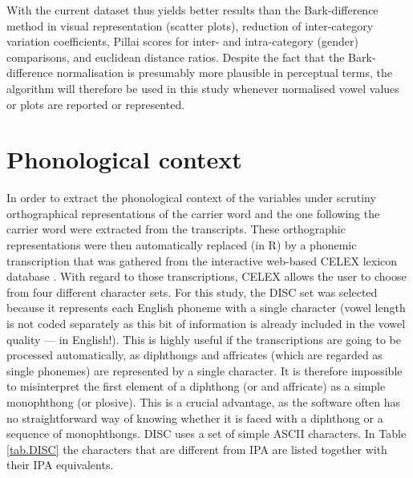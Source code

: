 With the current dataset \citeauthor{wattfabricius2002} thus yields better results than the Bark-difference method in visual representation (scatter plots), reduction of inter-category variation coefficients, Pillai scores for inter- and intra-category (gender) comparisons, and euclidean distance ratios.
Despite the fact that the Bark-difference normalisation is presumably more plausible in perceptual terms, the \citeauthor{wattfabricius2002} algorithm will therefore be used in this study whenever normalised vowel values or plots are reported or represented.

\section{Phonological context}
\label{sec.prod_method.phon}

In order to extract the phonological context of the variables under scrutiny orthographical representations of the carrier word and the one following the carrier word were extracted from the transcripts.
These orthographic representations were then automatically replaced (in R) by a phonemic transcription that was gathered from the interactive web-based CELEX lexicon database \parencite{baayenetal1993}.
With regard to those transcriptions, CELEX allows the user to choose from four different character sets.
For this study, the DISC set was selected because it represents each English phoneme with a single character (vowel length is not coded separately as this bit of information is already included in the vowel quality --- in English!).
This is highly useful if the transcriptions are going to be processed automatically, as diphthongs and affricates (which are regarded as single phonemes) are represented by a single character.
It is therefore impossible to misinterpret the first element of a diphthong (or and affricate) as a simple monophthong (or plosive).
This is a crucial advantage, as the software often has no straightforward way of knowing whether it is faced with a diphthong or a sequence of monophthongs.
DISC uses a set of simple ASCII characters.
In Table \ref{tab.DISC} the characters that are different from IPA are listed together with their IPA equivalents.

